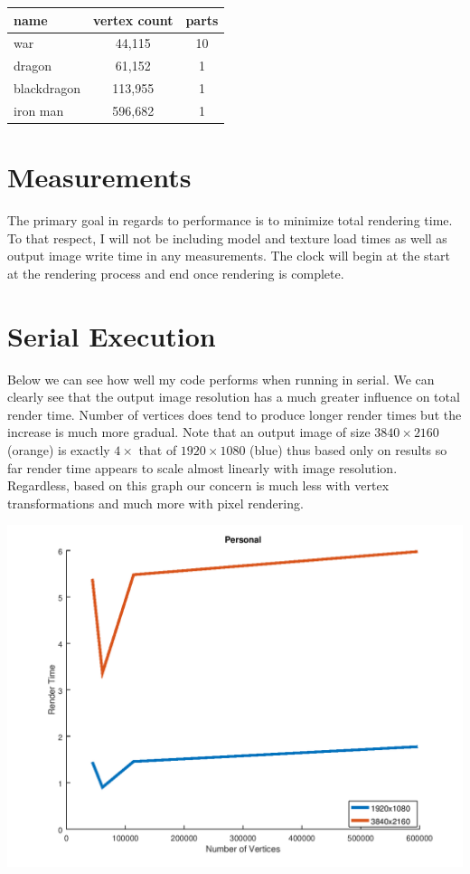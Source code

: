 \documentclass[12pt]{article}
\begin{document}
\bigbreak
\begin{center}
	\begin{tabular}{|l|c|c|}
		\hline
		name & vertex count & parts \\ \hline \hline
		war & 44,115 & 10 \\ \hline
		dragon & 61,152 & 1 \\ \hline
		blackdragon & 113,955 & 1 \\ \hline
		iron man & 596,682 & 1 \\ \hline
	\end{tabular}
\end{center}

\section*{Measurements}

The primary goal in regards to performance is to minimize total rendering time. To that respect, I will
not be including model and texture load times as well as output image write time in any measurements. 
The clock will begin at the start at the rendering process and end once rendering is complete.

\section*{Serial Execution}

Below we can see how well my code performs when running in serial. We can clearly see that the output
image resolution has a much greater influence on total render time. Number of vertices does tend to
produce longer render times but the increase is much more gradual. Note that an output image of 
size $3840\times2160$ (orange) is exactly $4\times$ that of $1920\times1080$ (blue) thus based only on results so far
render time appears to scale almost linearly with image resolution. Regardless, based on this graph
our concern is much less with vertex transformations and much more with pixel rendering.

\begin{center}
	\includegraphics[scale=0.5]{serial_personal.png}
\end{center}
\end{document}
